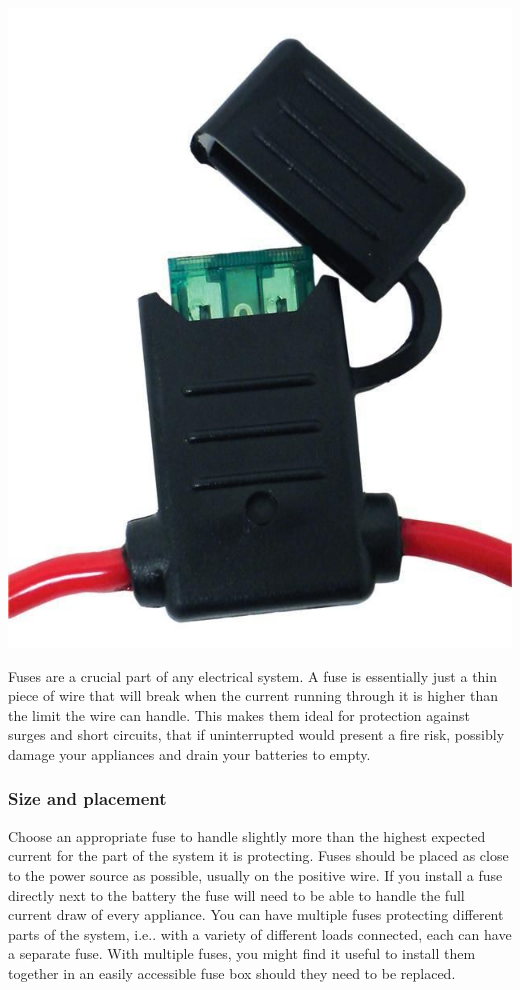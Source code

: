 \documentclass{article}
\theoremstyle{definition}
\theoremstyle{definition}
\theoremstyle{remark}
\begin{document}
    \begin{center}
      \includegraphics[width=0.15\paperwidth]{../Images/image_8_1_(fuse).png}
    \end{center}

    Fuses are a crucial part of any electrical system. A fuse is essentially just a thin piece of wire that will break when the current running through it is higher than the limit the wire can handle. This makes them ideal for protection against surges and short circuits, that if uninterrupted would present a fire risk, possibly damage your appliances and drain your batteries to empty. 
  
    \subsubsection{Size and placement} %
    \label{ssub:size_and_placement}

      Choose an appropriate fuse to handle slightly more than the highest expected current for the part of the system it is protecting. Fuses should be placed as close to the power source as possible, usually on the positive wire. If you install a fuse directly next to the battery the fuse will need to be able to handle the full current draw of every appliance. You can have multiple fuses protecting different parts of the system, i.e.. with a variety of different loads connected, each can have a separate fuse. With multiple fuses, you might find it useful to install them together in an easily accessible fuse box should they need to be replaced. 
\end{document}
